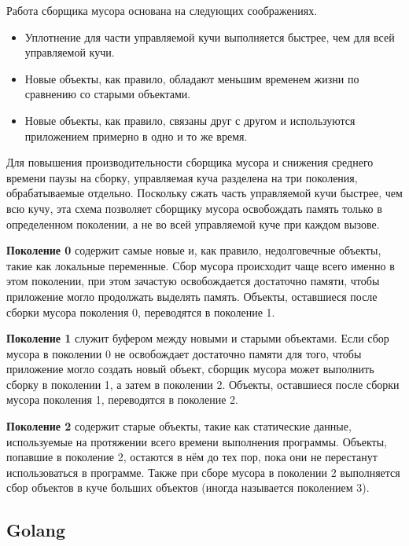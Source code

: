 Работа сборщика мусора основана на следующих соображениях.~\cite{dotnet_gc}

\begin{itemize}[label*=---]
	\item Уплотнение для части управляемой кучи выполняется быстрее, чем для всей управляемой кучи.
	\item Новые объекты, как правило, обладают меньшим временем жизни по сравнению со старыми объектами.
	\item Новые объекты, как правило, связаны друг с другом и используются приложением примерно в одно и то же время.
\end{itemize}

Для повышения производительности сборщика мусора и снижения среднего времени паузы на сборку, управляемая куча разделена на три поколения, обрабатываемые отдельно. Поскольку сжать часть управляемой кучи быстрее, чем всю кучу, эта схема позволяет сборщику мусора освобождать память только в определенном поколении, а не во всей управляемой куче при каждом вызове.~\cite{dotnet_gc}~\cite{dotnet_memory}

\textbf{Поколение 0} содержит самые новые и, как правило, недолговечные объекты, такие как локальные переменные. Сбор мусора происходит чаще всего именно в этом поколении, при этом зачастую освобождается достаточно памяти, чтобы приложение могло продолжать выделять память. Объекты, оставшиеся после сборки мусора поколения 0, переводятся в поколение 1.

\textbf{Поколение 1} служит буфером между новыми и старыми объектами. Если сбор мусора в поколении 0 не освобождает достаточно памяти для того, чтобы приложение могло создать новый объект, сборщик мусора может выполнить сборку в поколении 1, а затем в поколении 2. Объекты, оставшиеся после сборки мусора поколения 1, переводятся в поколение 2.

\textbf{Поколение 2} содержит старые объекты, такие как статические данные, используемые на протяжении всего времени выполнения программы. Объекты, попавшие в поколение 2, остаются в нём до тех пор, пока они не перестанут использоваться в программе. Также при сборе мусора в поколении 2 выполняется сбор объектов в куче больших объектов (иногда называется поколением 3).

\subsection*{Golang}


